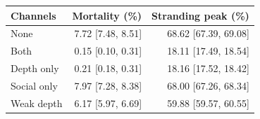 \begin{tabular}{lrr}
\toprule
Channels & Mortality (\%) & Stranding peak (\%) \\
\midrule
None & 7.72 [7.48, 8.51] & 68.62 [67.39, 69.08] \\
Both & 0.15 [0.10, 0.31] & 18.11 [17.49, 18.54] \\
Depth only & 0.21 [0.18, 0.31] & 18.16 [17.52, 18.42] \\
Social only & 7.97 [7.28, 8.38] & 68.00 [67.26, 68.34] \\
Weak depth & 6.17 [5.97, 6.69] & 59.88 [59.57, 60.55] \\
\bottomrule
\end{tabular}
